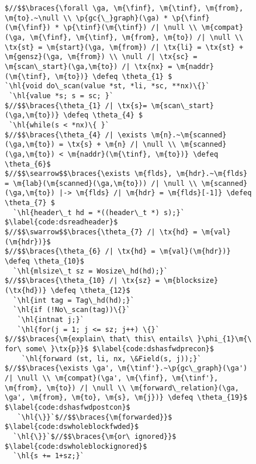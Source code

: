 \renewcommand{\tx}[1]{\scriptsize {\text{#1}}}

\begin{figure}[t]
\vspace{-1ex}
  \begin{lstlisting}[multicols = 2]
$//$$\braces{\forall \ga, \m{\finf}, \m{\tinf}, \m{from}, \m{to}.~\null \\ \p{gc{\_}graph}(\ga) * \p{\finf}(\m{\finf}) * \p{\tinf}(\m{\tinf}) /| \null \\ \m{compat}(\ga, \m{\finf}, \m{\tinf}, \m{from}, \m{to}) /| \null \\ \tx{st} = \m{start}(\ga, \m{from}) /| \tx{li} = \tx{st} + \m{gensz}(\ga, \m{from}) \\ \null /| \tx{sc} = \m{scan\_start}(\ga,\m{to}) /| \tx{nx} = \m{naddr}(\m{\tinf}, \m{to})} \defeq \theta_{1} $
`\hl{void do\_scan(value *st, *li, *sc, **nx)\{}`
 `\hl{value *s; s = sc; }`
$//$$\braces{\theta_{1} /| \tx{s}= \m{scan\_start}(\ga,\m{to})} \defeq \theta_{4} $
 `\hl{while(s < *nx)\{ }`
$//$$\braces{\theta_{4} /| \exists \m{n}.~\m{scanned}(\ga,\m{to}) = \tx{s} + \m{n} /| \null \\ \m{scanned}(\ga,\m{to}) < \m{naddr}(\m{\tinf}, \m{to})} \defeq \theta_{6}$
$//$$\searrow$$\braces{\exists \m{flds}, \m{hdr}.~\m{flds} = \m{lab}(\m{scanned}(\ga,\m{to})) /| \null \\ \m{scanned}(\ga,\m{to}) |-> \m{flds} /| \m{hdr} = \m{flds}[-1]} \defeq \theta_{7} $
  `\hl{header\_t hd = *((header\_t *) s);}` $\label{code:dsreadheader}$
$//$$\swarrow$$\braces{\theta_{7} /| \tx{hd} = \m{val}(\m{hdr})}$
$//$$\braces{\theta_{6} /| \tx{hd} = \m{val}(\m{hdr})} \defeq \theta_{10}$
  `\hl{mlsize\_t sz = Wosize\_hd(hd);}`
$//$$\braces{\theta_{10} /| \tx{sz} = \m{blocksize}(\tx{hd})} \defeq \theta_{12}$
  `\hl{int tag = Tag\_hd(hd);}`
  `\hl{if (!No\_scan(tag))\{}`
   `\hl{intnat j;}`
   `\hl{for(j = 1; j <= sz; j++) \{}`
$//$$\braces{\m{explain\ that\ this\ entails\ }\phi_{1}\m{\ for\ some\ }\tx{p}}$ $\label{code:dshasfwdprecon}$
    `\hl{forward (st, li, nx, \&Field(s, j));}` 
$//$$\braces{\exists \ga', \m{\tinf'}.~\p{gc\_graph}(\ga') /| \null \\ \m{compat}(\ga', \m{\finf}, \m{\tinf'}, \m{from}, \m{to}) /| \null \\ \m{forward\_relation}(\ga, \ga', \m{from}, \m{to}, \m{s}, \m{j})} \defeq \theta_{19}$ $\label{code:dshasfwdpostcon}$
   `\hl{\}}`$//$$\braces{\m{forwarded}}$ $\label{code:dswholeblockfwded}$
  `\hl{\}}`$//$$\braces{\m{or\ ignored}}$ $\label{code:dswholeblockignored}$
  `\hl{s += 1+sz;}`

\end{lstlisting}
\end{figure}

